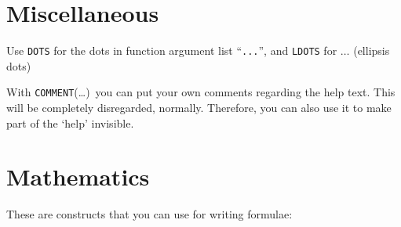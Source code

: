\documentclass[a4paper,11pt]{article}
\begin{document}
\section{Miscellaneous}
Use \texttt{DOTS} for the dots in function argument list ``\texttt{...}'',
and \texttt{LDOTS} for $\ldots$ (ellipsis dots)

With \texttt{COMMENT}(\dots)\ you can put your own comments regarding the
help text. This will be completely disregarded, normally. Therefore, you
can also use it to make part of the `help' invisible.

\bigskip

\section{Mathematics}
These are constructs that you can use for writing formulae:
%
\end{document}
